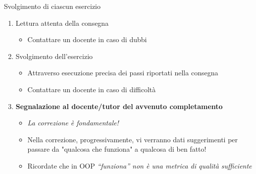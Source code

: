 \documentclass[xcolor=dvipsnames,presentation]{beamer}
\begin{document}
\begin{frame}{Svolgimento di ciascun esercizio}
    \begin{enumerate}\itemsep20pt
        \item Lettura attenta della consegna
        \begin{itemize}
            \item Contattare un docente in caso di dubbi
        \end{itemize}
        \item Svolgimento dell'esercizio
        \begin{itemize}
        	\item Attraverso esecuzione precisa dei passi riportati nella consegna
            \item Contattare un docente in caso di difficoltà
        \end{itemize}
        \item \textbf{Segnalazione al docente/tutor del avvenuto completamento}
        \begin{itemize}
            \item \textit{La correzione è fondamentale!}
            \item Nella correzione, progressivamente, vi verranno dati suggerimenti per passare da "qualcosa che funziona"
            a qualcosa di ben fatto!
            \item Ricordate che in OOP \textit{``funziona'' non è una metrica di qualità sufficiente}
        \end{itemize}
    \end{enumerate}
\end{frame}
\end{document}

